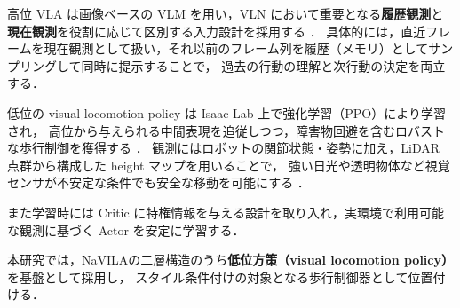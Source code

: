 高位 VLA は画像ベースの VLM を用い，VLN において重要となる\textbf{履歴観測}と\textbf{現在観測}を役割に応じて区別する入力設計を採用する \cite{NaVILA_paper}．
具体的には，直近フレームを現在観測として扱い，それ以前のフレーム列を履歴（メモリ）としてサンプリングして同時に提示することで，
過去の行動の理解と次行動の決定を両立する．

低位の visual locomotion policy は Isaac Lab 上で強化学習（PPO）により学習され，
高位から与えられる中間表現を追従しつつ，障害物回避を含むロバストな歩行制御を獲得する \cite{NaVILA_paper}．
観測にはロボットの関節状態・姿勢に加え，LiDAR 点群から構成した height マップを用いることで，
強い日光や透明物体など視覚センサが不安定な条件でも安全な移動を可能にする \cite{NaVILA_paper}．

また学習時には Critic に特権情報を与える設計を取り入れ，実環境で利用可能な観測に基づく Actor を安定に学習する．

本研究では，NaVILAの二層構造のうち\textbf{低位方策（visual locomotion policy）}を基盤として採用し，
スタイル条件付けの対象となる歩行制御器として位置付ける．
